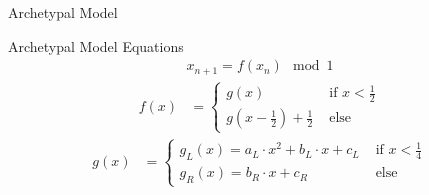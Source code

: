 \begin{frame}{Archetypal Model}
    \begin{figure}
        \centering
    \end{figure}
\end{frame}

\begin{frame}{Archetypal Model Equations}
    \vspace{-1.0em}
    \begin{align*}
        x_{n+1} = f(x_n) \mod 1
    \end{align*}
    \begin{align*}
        f(x) & = \begin{cases}
                        g(x)                                        & \text{ if } x < \frac{1}{2} \\
                        g\left(x - \frac{1}{2}\right) + \frac{1}{2} & \text{ else}
                    \end{cases}
    \end{align*}
    \begin{align*}
        g(x) & = \begin{cases}
                        g_L(x) = a_L \cdot x^2 + b_L \cdot x + c_L & \text{ if } x < \frac{1}{4} \\
                        g_R(x) = b_R \cdot x + c_R                 & \text{ else}
                    \end{cases}
    \end{align*}
\end{frame}

